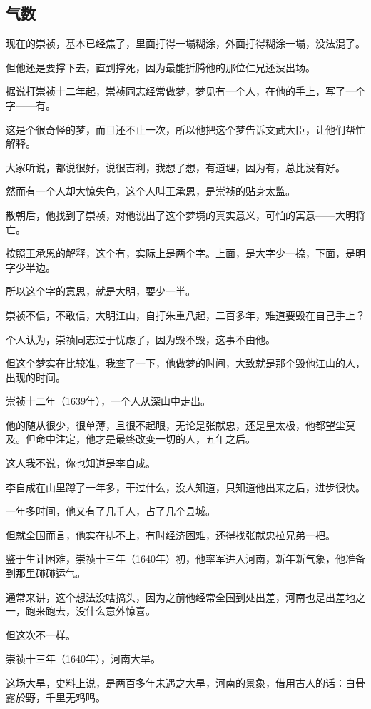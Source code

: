 \begin{multicols}{\theparacolNo}
		\subsection{气数}
		现在的崇祯，基本已经焦了，里面打得一塌糊涂，外面打得糊涂一塌，没法混了。

		但他还是要撑下去，直到撑死，因为最能折腾他的那位仁兄还没出场。

		据说打崇祯十二年起，崇祯同志经常做梦，梦见有一个人，在他的手上，写了一个字——有。

		这是个很奇怪的梦，而且还不止一次，所以他把这个梦告诉文武大臣，让他们帮忙解释。

		大家听说，都说很好，说很吉利，我想了想，有道理，因为有，总比没有好。

		然而有一个人却大惊失色，这个人叫王承恩，是崇祯的贴身太监。

		散朝后，他找到了崇祯，对他说出了这个梦境的真实意义，可怕的寓意——大明将亡。

		按照王承恩的解释，这个有，实际上是两个字。上面，是大字少一捺，下面，是明字少半边。

		所以这个字的意思，就是大明，要少一半。

		崇祯不信，不敢信，大明江山，自打朱重八起，二百多年，难道要毁在自己手上？

		个人认为，崇祯同志过于忧虑了，因为毁不毁，这事不由他。

		但这个梦实在比较准，我查了一下，他做梦的时间，大致就是那个毁他江山的人，出现的时间。

		崇祯十二年（1639年），一个人从深山中走出。

		他的随从很少，很单薄，且很不起眼，无论是张献忠，还是皇太极，他都望尘莫及。但命中注定，他才是最终改变一切的人，五年之后。

		这人我不说，你也知道是李自成。

		李自成在山里蹲了一年多，干过什么，没人知道，只知道他出来之后，进步很快。

		一年多时间，他又有了几千人，占了几个县城。

		但就全国而言，他实在排不上，有时经济困难，还得找张献忠拉兄弟一把。

		鉴于生计困难，崇祯十三年（1640年）初，他率军进入河南，新年新气象，他准备到那里碰碰运气。

		通常来讲，这个想法没啥搞头，因为之前他经常全国到处出差，河南也是出差地之一，跑来跑去，没什么意外惊喜。

		但这次不一样。

		崇祯十三年（1640年），河南大旱。

		这场大旱，史料上说，是两百多年未遇之大旱，河南的景象，借用古人的话：白骨露於野，千里无鸡鸣。


\end{multicols}
